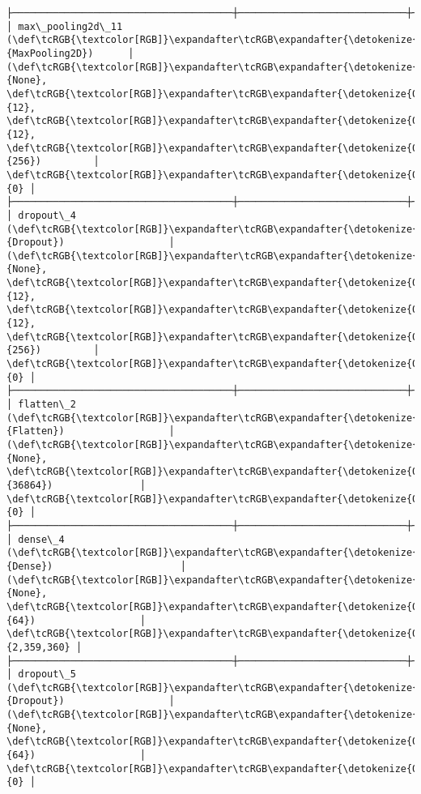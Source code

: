 \documentclass[11pt]{article}
\begin{document}
\begin{Verbatim}[commandchars=\\\{\}]
├──────────────────────────────────────┼─────────────────────────────┼─────────────────┤
│ max\_pooling2d\_11 (\def\tcRGB{\textcolor[RGB]}\expandafter\tcRGB\expandafter{\detokenize{0,135,255}}{MaxPooling2D})      │ (\def\tcRGB{\textcolor[RGB]}\expandafter\tcRGB\expandafter{\detokenize{0,215,255}}{None}, \def\tcRGB{\textcolor[RGB]}\expandafter\tcRGB\expandafter{\detokenize{0,175,0}}{12}, \def\tcRGB{\textcolor[RGB]}\expandafter\tcRGB\expandafter{\detokenize{0,175,0}}{12}, \def\tcRGB{\textcolor[RGB]}\expandafter\tcRGB\expandafter{\detokenize{0,175,0}}{256})         │               \def\tcRGB{\textcolor[RGB]}\expandafter\tcRGB\expandafter{\detokenize{0,175,0}}{0} │
├──────────────────────────────────────┼─────────────────────────────┼─────────────────┤
│ dropout\_4 (\def\tcRGB{\textcolor[RGB]}\expandafter\tcRGB\expandafter{\detokenize{0,135,255}}{Dropout})                  │ (\def\tcRGB{\textcolor[RGB]}\expandafter\tcRGB\expandafter{\detokenize{0,215,255}}{None}, \def\tcRGB{\textcolor[RGB]}\expandafter\tcRGB\expandafter{\detokenize{0,175,0}}{12}, \def\tcRGB{\textcolor[RGB]}\expandafter\tcRGB\expandafter{\detokenize{0,175,0}}{12}, \def\tcRGB{\textcolor[RGB]}\expandafter\tcRGB\expandafter{\detokenize{0,175,0}}{256})         │               \def\tcRGB{\textcolor[RGB]}\expandafter\tcRGB\expandafter{\detokenize{0,175,0}}{0} │
├──────────────────────────────────────┼─────────────────────────────┼─────────────────┤
│ flatten\_2 (\def\tcRGB{\textcolor[RGB]}\expandafter\tcRGB\expandafter{\detokenize{0,135,255}}{Flatten})                  │ (\def\tcRGB{\textcolor[RGB]}\expandafter\tcRGB\expandafter{\detokenize{0,215,255}}{None}, \def\tcRGB{\textcolor[RGB]}\expandafter\tcRGB\expandafter{\detokenize{0,175,0}}{36864})               │               \def\tcRGB{\textcolor[RGB]}\expandafter\tcRGB\expandafter{\detokenize{0,175,0}}{0} │
├──────────────────────────────────────┼─────────────────────────────┼─────────────────┤
│ dense\_4 (\def\tcRGB{\textcolor[RGB]}\expandafter\tcRGB\expandafter{\detokenize{0,135,255}}{Dense})                      │ (\def\tcRGB{\textcolor[RGB]}\expandafter\tcRGB\expandafter{\detokenize{0,215,255}}{None}, \def\tcRGB{\textcolor[RGB]}\expandafter\tcRGB\expandafter{\detokenize{0,175,0}}{64})                  │       \def\tcRGB{\textcolor[RGB]}\expandafter\tcRGB\expandafter{\detokenize{0,175,0}}{2,359,360} │
├──────────────────────────────────────┼─────────────────────────────┼─────────────────┤
│ dropout\_5 (\def\tcRGB{\textcolor[RGB]}\expandafter\tcRGB\expandafter{\detokenize{0,135,255}}{Dropout})                  │ (\def\tcRGB{\textcolor[RGB]}\expandafter\tcRGB\expandafter{\detokenize{0,215,255}}{None}, \def\tcRGB{\textcolor[RGB]}\expandafter\tcRGB\expandafter{\detokenize{0,175,0}}{64})                  │               \def\tcRGB{\textcolor[RGB]}\expandafter\tcRGB\expandafter{\detokenize{0,175,0}}{0} │

\end{Verbatim}
\end{document}
